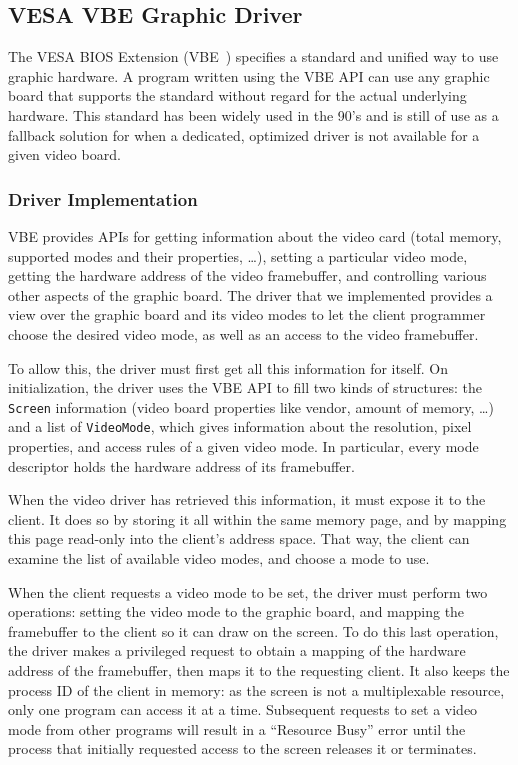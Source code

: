 \documentclass{acm_proc_article-sp}
\begin{document}
\subsection{VESA VBE Graphic Driver}
The VESA BIOS Extension (VBE~\cite{VBE}) specifies a standard and unified way to use graphic hardware. A program written using the VBE API can use any graphic board that supports the standard without regard for the actual underlying hardware. This standard has been widely used in the 90's and is still of use as a fallback solution for when a dedicated, optimized driver is not available for a given video board.

\subsubsection{Driver Implementation}
VBE provides APIs for getting information about the video card (total memory, supported modes and their properties, \ldots), setting a particular video mode, getting the hardware address of the video framebuffer, and controlling various other aspects of the graphic board. The driver that we implemented provides a view over the graphic board and its video modes to let the client programmer choose the desired video mode, as well as an access to the video framebuffer.

To allow this, the driver must first get all this information for itself. On initialization, the driver uses the VBE API to fill two kinds of structures: the \texttt{Screen} information (video board properties like vendor, amount of memory, \ldots) and a list of \texttt{VideoMode}, which gives information about the resolution, pixel properties, and access rules of a given video mode. In particular, every mode descriptor holds the hardware address of its framebuffer.

When the video driver has retrieved this information, it must expose it to the client. It does so by storing it all within the same memory page, and by mapping this page read-only into the client's address space. That way, the client can examine the list of available video modes, and choose a mode to use.

When the client requests a video mode to be set, the driver must perform two operations: setting the video mode to the graphic board, and mapping the framebuffer to the client so it can draw on the screen. To do this last operation, the driver makes a privileged request to obtain a mapping of the hardware address of the framebuffer, then maps it to the requesting client. It also keeps the process ID of the client in memory: as the screen is not a multiplexable resource, only one program can access it at a time. Subsequent requests to set a video mode from other programs will result in a ``Resource Busy'' error until the process that initially requested access to the screen releases it or terminates.
\end{document}
